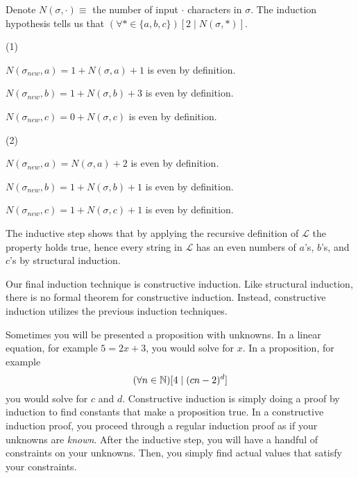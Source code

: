 \documentclass[main.tex]{subfiles}
\begin{document}
{	Denote \(N(\sigma, \cdot) \equiv\) the number of input \(\cdot\) characters in \(\sigma\). The induction hypothesis tells us that \((\forall * \in \{a,b,c\})[2 \mid N(\sigma, *)]\).
	
	(1)
	
	\(N(\sigma_{new}, a) = 1 + N(\sigma, a) + 1\) is even by definition.
	
	\(N(\sigma_{new}, b) = 1 + N(\sigma, b) + 3\) is even by definition.
	
	\(N(\sigma_{new}, c) = 0 + N(\sigma, c)\) is even by definition.
	
	(2)
	
	\(N(\sigma_{new}, a) = N(\sigma, a) + 2\) is even by definition.
	
	\(N(\sigma_{new}, b) = 1 + N(\sigma, b) + 1\) is even by definition.
	
	\(N(\sigma_{new}, c) = 1 + N(\sigma, c) + 1\) is even by definition.
	
	The inductive step shows that by applying the recursive definition of \(\mathcal{L}\) the property holds true, hence every string in \(\mathcal{L}\) has an even numbers of \(a\)'s, \(b\)'s, and \(c\)'s by structural induction.
}

\sectionbreak

Our final induction technique is constructive induction. Like structural induction, there is no formal theorem for constructive induction. Instead, constructive induction utilizes the previous induction techniques.

Sometimes you will be presented a proposition with unknowns. In a linear equation, for example \(5 = 2x + 3\), you would solve for \(x\). In a proposition, for example \[(\forall n \in \mathbb{N})[ 4 \mid (cn - 2)^d ]\] you would solve for \(c\) and \(d\). Constructive induction is simply doing a proof by induction to find constants that make a proposition true. In a constructive induction proof, you proceed through a regular induction proof as if your unknowns are \textit{known}. After the inductive step, you will have a handful of constraints on your unknowns. Then, you simply find actual values that satisfy your constraints.
\end{document}
